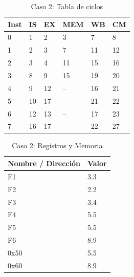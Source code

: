 \documentclass[a4paper]{article}
\begin{document}
	\begin{table}[H]
		\centering
		\caption*{Caso 2: Tabla de ciclos}
		\begin{tabular}{|l|l|l|l|l|l|}
			\hline
			\textbf{Inst} & \textbf{IS} & \textbf{EX} & \textbf{MEM} & \textbf{WB} & \textbf{CM} \\ \hline
			0             & 1           & 2           & 3            & 7           & 8           \\ \hline
			1             & 2           & 3           & 7            & 11          & 12          \\ \hline
			2             & 3           & 4           & 11           & 15          & 16          \\ \hline
			3             & 8           & 9           & 15           & 19          & 20          \\ \hline
			4             & 9           & 12          & --           & 16          & 21          \\ \hline
			5             & 10          & 17          & --           & 21          & 22          \\ \hline
			6             & 12          & 13          & --           & 17          & 23          \\ \hline
			7             & 16          & 17          & --           & 22          & 27          \\ \hline
			\end{tabular}
	\end{table}

	\begin{table}[H]
		\centering
		\caption*{Caso 2: Registros y Memoria}
		\begin{tabular}{|l|l|}
			\hline
			\textbf{Nombre / Dirección} & \textbf{Valor} \\ \hline
			F1                          & 3.3            \\ \hline
			F2                          & 2.2            \\ \hline
			F3                          & 3.4            \\ \hline
			F4                          & 5.5            \\ \hline
			F5                          & 5.5            \\ \hline
			F6                          & 8.9            \\ \hline
			0x50                        & 5.5            \\ \hline
			0x60                        & 8.9            \\ \hline
		\end{tabular}
	\end{table}
\end{document}
